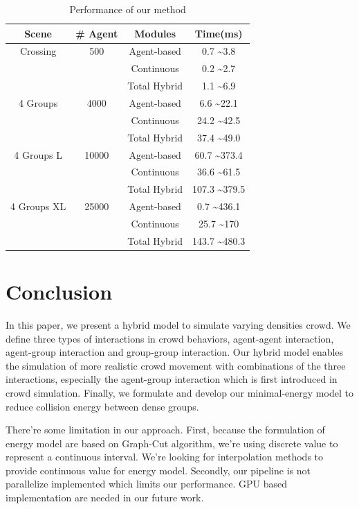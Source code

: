 \documentclass{egpubl}
\begin{document}
\begin{table}  
\centering  
\begin{tabular}{|c|c|c|c|}
\hline 
Scene & \# Agent & Modules & Time(ms) \\ 
\hline 
Crossing & 500 & Agent-based & 0.7 \textasciitilde 3.8 \\ 
 &  & Continuous & 0.2 \textasciitilde 2.7 \\ 
 &  & Total Hybrid & 1.1 \textasciitilde 6.9 \\ 
\hline 
4 Groups & 4000 & Agent-based & 6.6 \textasciitilde 22.1 \\ 
 &  & Continuous & 24.2 \textasciitilde 42.5 \\ 
 &  & Total Hybrid & 37.4 \textasciitilde 49.0 \\ 
\hline 
4 Groups L & 10000 & Agent-based & 60.7 \textasciitilde 373.4 \\ 
 &  & Continuous & 36.6 \textasciitilde 61.5 \\ 
 &  & Total Hybrid & 107.3 \textasciitilde 379.5 \\ 
\hline 
4 Groups XL & 25000 & Agent-based & 0.7 \textasciitilde 436.1 \\ 
 &  & Continuous & 25.7 \textasciitilde 170 \\  
 &  & Total Hybrid & 143.7 \textasciitilde 480.3 \\ 
\hline 
\end{tabular} 
\caption{Performance of our method}  
\label{table:1}
\end{table}
\section{Conclusion}
In this paper, we present a hybrid model to simulate varying densities crowd. We define three types of interactions in crowd behaviors, agent-agent interaction, agent-group interaction and group-group interaction. Our hybrid model enables the simulation of more realistic crowd movement with combinations of the three interactions, especially the agent-group interaction which is first introduced in crowd simulation. Finally, we formulate and develop our minimal-energy model to reduce collision energy between dense groups. 

There're some limitation in our approach. First, because the formulation of energy model are based on Graph-Cut algorithm, we're using discrete value to represent a continuous interval. We're looking for interpolation methods to provide continuous value for energy model. Secondly, our pipeline is not parallelize implemented which limits our performance. GPU based implementation are needed in our future work. 

%



\end{document}
